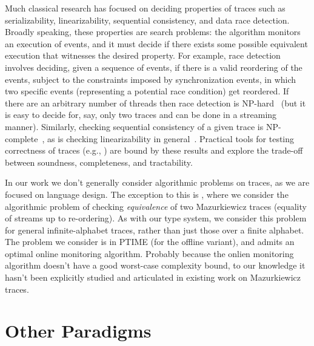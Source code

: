 Much classical research has focused on deciding properties of traces such as serializability, linearizability, sequential consistency, and data race detection.
Broadly speaking, these properties are search problems: the algorithm monitors an execution of events, and it must decide if there exists some possible equivalent execution that witnesses the desired property. For example, race detection involves deciding, given a sequence of events, if there is a valid reordering of the events, subject to the constraints imposed by synchronization events, in which two specific events (representing a potential race condition) get reordered. If there are an arbitrary number of threads then race detection is NP-hard~\cite{netzer1990complexity,netzer1992race}
(but it is easy to decide for, say, only two traces and can be done in a streaming manner).
Similarly, checking sequential consistency of a given trace is NP-complete~\cite{gibbons1992complexity},
as is checking linearizability in general~\cite{gibbons1997testing}.
Practical tools for testing correctness of traces (e.g., \cite{savage1997eraser,park2011efficient,sen2008race,wing1993testing,burckhardt2010line,lowe2017testing}) are bound by these results and explore the trade-off between soundness, completeness, and tractability.

In our work we don't generally consider algorithmic problems on traces,
as we are focused on language design.
The exception to this is ,
where we consider the algorithmic problem of checking \emph{equivalence} of two Mazurkiewicz traces (equality of streams up to re-ordering).
As with our type system, we consider this problem for general infinite-alphabet traces, rather than just those over a finite alphabet.
The problem we consider is in PTIME (for the offline variant), and admits an optimal online monitoring algorithm.
Probably because the onlien monitoring algorithm doesn't have a good worst-case complexity bound, to our knowledge it hasn't been explicitly studied and articulated in existing work on Mazurkiewicz traces.

\section{Other Paradigms}


